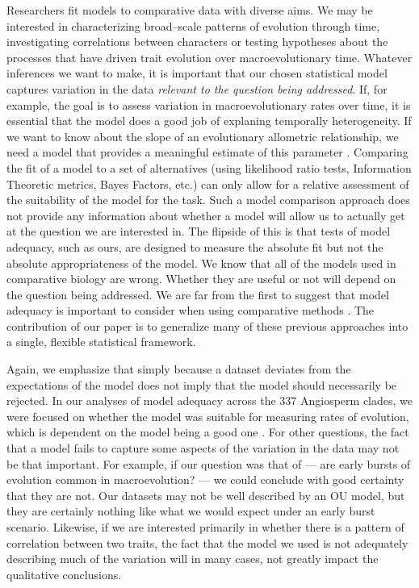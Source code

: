 \documentclass[a4paper,11pt]{article}
\begin{document}
{Researchers fit models to comparative data with diverse aims. We may be interested in characterizing broad--scale patterns of evolution through time, investigating correlations between characters or testing hypotheses about the processes that have driven trait evolution over macroevolutionary time. Whatever inferences we want to make, it is important that our chosen statistical model captures variation in the data \emph{relevant to the question being addressed}. If, for example, the goal is to assess variation in macroevolutionary rates over time, it is essential that the model does a good job of explaning temporally heterogeneity. If we want to know about the slope of an evolutionary allometric relationship, we need a model that provides a meaningful estimate of this parameter \citep{Hansen2012}. Comparing the fit of a model to a set of alternatives (using likelihood ratio tests, Information Theoretic metrics, Bayes Factors, etc.) can only allow for a relative assessment of the suitability of the model for the task. Such a model comparison approach does not provide any information about whether a model will allow us to actually get at the question we are interested in. The flipside of this is that tests of model adequacy, such as ours, are designed to measure the absolute fit but not the absolute appropriateness of the model. We know that all of the models used in comparative biology are wrong. Whether they are useful or not will depend on the question being addressed. We are far from the first to suggest that model adequacy is important to consider when using comparative methods \citep[see, for example][]{Felsenstein1985, Felsenstein1988, HarveyPagel1991, Garland1992, Diaz1996, HansenMartins1996, Price1997, Garland1999, GarlandIves2000, HansenOrzack2005, Hansen2012, Felsenstein2012, Boettiger2012, SlaterPennell, Beaulieu2013, Blackmon2014}. The contribution of our paper is to generalize many of these previous approaches into a single, flexible statistical framework. 

Again, we emphasize that simply because a dataset deviates from the expectations of the model does not imply that the model should necessarily be rejected. In our analyses of model adequacy across the 337 Angiosperm clades, we were focused on whether the model was suitable for measuring rates of evolution, which is dependent on the model being a good one \citep{Hunt2012}. For other questions, the fact that a model fails to capture some aspects of the variation in the data may not be that important. For example, if our question was that of \citet{Harmon2010} --- are early bursts of evolution common in macroevolution? --- we could conclude with good certainty that they are not. Our datasets may not be well described by an OU model, but they are certainly nothing like what we would expect under an early burst scenario. Likewise, if we are interested primarily in whether there is a pattern of correlation between two traits, the fact that the model we used is not adequately describing much of the variation will in many cases, not greatly impact the qualitative conclusions.

}
\end{document}
